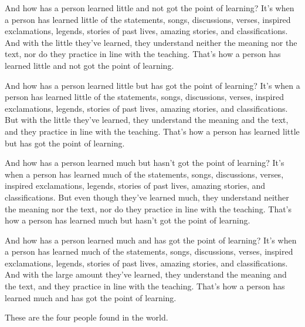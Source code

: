 \documentclass[12pt,openany]{book}%
\begin{document}
And how has a person learned little and not got the point of learning? It’s when a person has learned little of the statements, songs, discussions, verses, inspired exclamations, legends, stories of past lives, amazing stories, and classifications. And with the little they’ve learned, they understand neither the meaning nor the text, nor do they practice in line with the teaching. That’s how a person has learned little and not got the point of learning. 

And how has a person learned little but has got the point of learning? It’s when a person has learned little of the statements, songs, discussions, verses, inspired exclamations, legends, stories of past lives, amazing stories, and classifications. But with the little they’ve learned, they understand the meaning and the text, and they practice in line with the teaching. That’s how a person has learned little but has got the point of learning. 

And how has a person learned much but hasn't got the point of learning? It’s when a person has learned much of the statements, songs, discussions, verses, inspired exclamations, legends, stories of past lives, amazing stories, and classifications. But even though they’ve learned much, they understand neither the meaning nor the text, nor do they practice in line with the teaching. That’s how a person has learned much but hasn't got the point of learning. 

And how has a person learned much and has got the point of learning? It’s when a person has learned much of the statements, songs, discussions, verses, inspired exclamations, legends, stories of past lives, amazing stories, and classifications. And with the large amount they’ve learned, they understand the meaning and the text, and they practice in line with the teaching. That’s how a person has learned much and has got the point of learning. 

These are the four people found in the world. 
\end{document}

